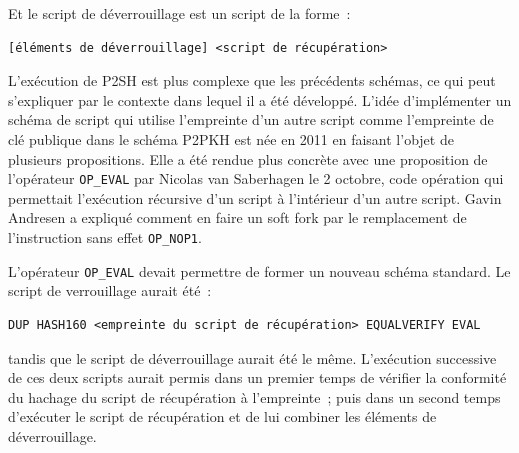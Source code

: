 Et le script de déverrouillage est un script de la forme~:

\begin{Verbatim}[fontsize=\footnotesize]
[éléments de déverrouillage] <script de récupération>
\end{Verbatim}

L'exécution de P2SH est plus complexe que les précédents schémas, ce qui peut s'expliquer par le contexte dans lequel il a été développé. L'idée d'implémenter un schéma de script qui utilise l'empreinte d'un autre script comme l'empreinte de clé publique dans le schéma P2PKH est née en 2011 en faisant l'objet de plusieurs propositions. Elle a été rendue plus concrète avec une proposition de l'opérateur \texttt{OP\_EVAL} par Nicolas van Saberhagen le 2 octobre, code opération qui permettait l'exécution récursive d'un script à l'intérieur d'un autre script. Gavin Andresen a expliqué comment en faire un soft fork par le remplacement de l'instruction sans effet \texttt{OP\_NOP1}.

L'opérateur \texttt{OP\_EVAL} devait permettre de former un nouveau schéma standard. Le script de verrouillage aurait été~:

\begin{Verbatim}[fontsize=\footnotesize]
DUP HASH160 <empreinte du script de récupération> EQUALVERIFY EVAL
\end{Verbatim}

tandis que le script de déverrouillage aurait été le même. L'exécution successive de ces deux scripts aurait permis dans un premier temps de vérifier la conformité du hachage du script de récupération à l'empreinte~; puis dans un second temps d'exécuter le script de récupération et de lui combiner les éléments de déverrouillage.

